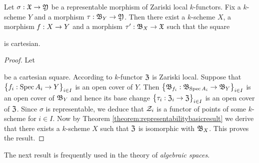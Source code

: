 \begin{proposition}\label{proposition:representablearerepresentableafterarbitrarybasechange}
Let $\sigma:{\mathfrak X}\rightarrow {\mathfrak Y}$ be a representable morphism of Zariski local $k$-functors. Fix a $k$-scheme $Y$ and a morphism $\tau:{\mathfrak B}_Y\rightarrow {\mathfrak Y}$. Then there exist a $k$-scheme $X$, a morphism $f:X\rightarrow Y$ and a morphism $\tau':{\mathfrak B}_X\rightarrow {\mathfrak X}$ such that the square
\begin{center}
\end{center}
is cartesian.
\end{proposition}
\begin{proof}
Let
\begin{center}
\end{center}
be a cartesian square. According to {\cite[Theorem 2.12]{Sheaves}} $k$-functor ${\mathfrak Z}$ is Zariski local. Suppose that $\big\{f_i:\mathrm{Spec}\, A_i\rightarrow Y\big\}_{i\in I}$ is an open cover of $Y$. Then $\big\{{\mathfrak B}_{f_i}:{\mathfrak B}_{\mathrm{Spec}\, A_i}\rightarrow {\mathfrak B}_Y\big\}_{i\in I}$ is an open cover of ${\mathfrak B}_Y$ and hence its base change $\big\{\tau_i:{\mathfrak Z}_i\rightarrow {\mathfrak Z}\big\}_{i\in I}$ is an open cover of ${\mathfrak Z}$. Since $\sigma$ is representable, we deduce that ${\mathcal Z}_i$ is a functor of points of some $k$-scheme for $i\in I$. Now by Theorem \ref{theorem:representabilitybasicresult} we derive that there exists a $k$-scheme $X$ such that ${\mathfrak Z}$ is isomorphic with ${\mathfrak B}_X$. This proves the result.
\end{proof}
\noindent
The next result is frequently used in the theory of \textit{algebraic spaces}.

